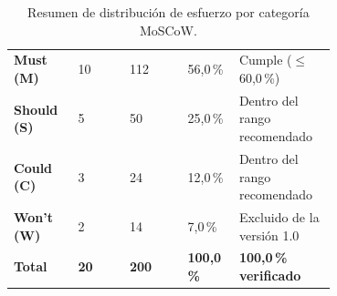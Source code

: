 \begin{table}[htbp]
\centering
\footnotesize
\caption{Resumen de distribuci\'on de esfuerzo por categor\'ia MoSCoW.}
\label{tab:moscow-resumen}
\begin{tabularx}{\linewidth}{|p{0.20\linewidth}|p{0.16\linewidth}|p{0.18\linewidth}|p{0.16\linewidth}|Y|}
\hline
{} &  &  &  & \\
\hline
\textbf{Must (M)} & 10 & 112 & 56,0\,\% & Cumple ($\le$ 60,0\,\%)\\
\hline
{} \textbf{Should (S)} & 5 & 50 & 25,0\,\% & Dentro del rango recomendado\\
\hline
\textbf{Could (C)} & 3 & 24 & 12,0\,\% & Dentro del rango recomendado\\
\hline
{} \textbf{Won't (W)} & 2 & 14 & 7,0\,\% & Excluido de la versi\'on 1.0\\
\hline
\textbf{Total} & \textbf{20} & \textbf{200} & \textbf{100,0\,\%} & \textbf{100,0\,\% verificado}\\
\hline
\end{tabularx}
\end{table}
